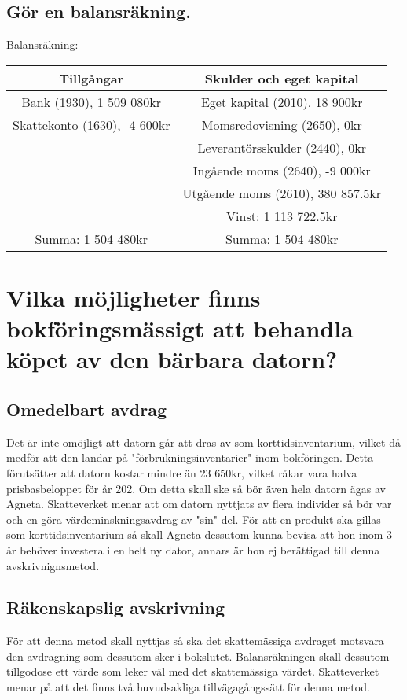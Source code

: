\documentclass[a4paper, titlepage,12pt]{article}
\begin{document}
		\subsection{Gör en balansräkning.}
			Balansräkning:
			\begin{center}
				\begin{tabular}{|c|c|}
					\hline
					\textbf{Tillgångar} & \textbf{Skulder och eget kapital} \\
					\hline
					Bank (1930), 1 509 080kr & Eget kapital (2010), 18 900kr \\
					\hline
					Skattekonto (1630), -4 600kr & Momsredovisning (2650), 0kr \\
					\hline
					& Leverantörsskulder (2440), 0kr \\
					\hline
					& Ingående moms (2640), -9 000kr \\
					\hline
					& Utgående moms (2610), 380 857.5kr \\
					\hline
					& Vinst: 1 113 722.5kr \\
					\hline
					Summa: 1 504 480kr & Summa: 1 504 480kr\\
					\hline
				\end{tabular}
			\end{center}
	\section{Vilka möjligheter finns bokföringsmässigt att behandla köpet av den bärbara datorn?}
		\subsection{Omedelbart avdrag}
		Det är inte omöjligt att datorn går att dras av som korttidsinventarium, vilket då medför att den landar på "förbrukningsinventarier" inom bokföringen. Detta förutsätter att datorn kostar mindre än 23 650kr, vilket råkar vara halva prisbasbeloppet för år 202\cite{skatteverket}. Om detta skall ske så bör även hela datorn ägas av Agneta. Skatteverket menar att om datorn nyttjats av flera individer så bör var och en göra värdeminskningsavdrag av "sin" del. För att en produkt ska gillas som korttidsinventarium så skall Agneta dessutom kunna bevisa att hon inom 3 år behöver investera i en helt ny dator, annars är hon ej berättigad till denna avskrivnignsmetod.
		\subsection{Räkenskapslig avskrivning}
			För att denna metod skall nyttjas så ska det skattemässiga avdraget motsvara den avdragning som dessutom sker i bokslutet. Balansräkningen skall dessutom tillgodose ett värde som leker väl med det skattemässiga värdet. Skatteverket menar på att det finns två huvudsakliga tillvägagångssätt för denna metod\cite{skatteverket}.
\end{document}
